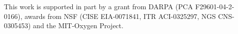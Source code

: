 \documentclass{csailabstractbook}
\begin{document}
This work is supported in part by a grant from DARPA (PCA
F29601-04-2-0166), awards from NSF (CISE EIA-0071841, ITR ACI-0325297,
NGS CNS-0305453) and the MIT-Oxygen Project.


\end{document}
